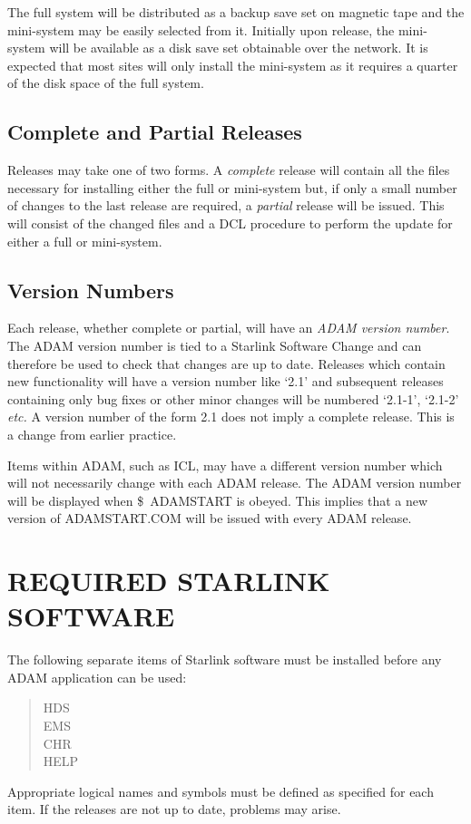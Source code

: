 The full system will be distributed as a backup save set on magnetic tape and
the mini-system may be easily selected from it.
Initially upon release, the mini-system will be available as a disk save set
obtainable over the network.
It is expected that most sites will only install the mini-system as it requires
a quarter of the disk space of the full system.

\subsection{Complete and Partial Releases}
Releases may take one of two forms.
A {\em complete} release will contain all the files necessary for installing
either the full or mini-system but, if only a small number of changes to the
last release are required, a {\em partial} release will be issued.
This will consist of the changed files and a DCL procedure to perform the
update for either a full or mini-system.

\subsection{Version Numbers}
\label{vers}
Each release, whether complete or partial, will have an {\em ADAM version
number}.
The ADAM version number is tied to a Starlink Software Change and can therefore
be used to check that changes are up to date.
Releases which contain new functionality will have a version number like `2.1'
and subsequent releases containing only bug fixes or other minor changes will
be numbered `2.1-1', `2.1-2' {\em etc.}
A version number of the form 2.1 does not imply a complete release. This is a
change from earlier practice.

Items within ADAM, such as ICL, may have a different version number which will
not necessarily change with each ADAM release.
The ADAM version number will be displayed when \mbox{\$ ADAMSTART} is obeyed.
This implies that a new version of ADAMSTART.COM will be issued with every ADAM
release.

\section{REQUIRED STARLINK SOFTWARE}
\label{reqs}
The following separate items of Starlink software must be installed before any
ADAM application can be used:
\small \begin{quote}
HDS \\
EMS \\
CHR \\
HELP

\end{quote} \normalsize
Appropriate logical names and symbols must be defined as specified for each
item.
If the releases are not up to date, problems may arise.

